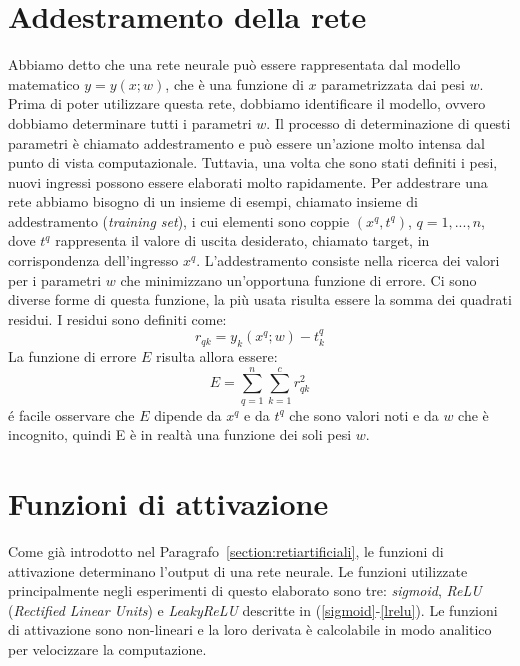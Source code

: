 \documentclass[11pt,a4paper,twoside,
openright]{book}
\begin{document}
\section{Addestramento della rete}
\label{addestramento}
Abbiamo detto che una rete neurale può essere rappresentata dal modello matematico $y = y(x; w)$, che è una funzione di $x$ parametrizzata dai pesi $w$. Prima di poter utilizzare questa rete, dobbiamo identificare il modello, ovvero dobbiamo determinare tutti i parametri $w$. Il processo di determinazione di questi parametri è chiamato addestramento e può essere un’azione molto intensa dal punto di vista computazionale. Tuttavia, una volta che sono stati definiti i pesi, nuovi ingressi possono essere elaborati molto rapidamente.
Per addestrare una rete abbiamo bisogno di un insieme di esempi, chiamato insieme di addestramento (\textit{training set}), i cui elementi sono coppie $(x^{q}, t^{q})$, $q = 1, ..., n$, dove $t^{q}$ rappresenta il valore di uscita desiderato, chiamato target, in corrispondenza dell'ingresso $x^{q}$. 
L’addestramento consiste nella ricerca dei valori per i parametri $w$ che minimizzano un’opportuna funzione di errore. Ci sono diverse forme di questa funzione, la più usata risulta essere la somma dei quadrati residui. I residui sono definiti come:
\begin{equation}
r_{qk} = y_{k}\left(x^{q}; w\right) - t^{q}_{k}
\label{res}
\end{equation}
La funzione di errore $E$ risulta allora essere:
\begin{equation}
E = \sum\limits_{q=1}^n \sum\limits_{k=1}^c r_{qk}^{2}
\label{quadres}
\end{equation}
é facile osservare che $E$ dipende da $x^{q}$ e da $t^{q}$ che sono valori noti e da $w$ che è incognito, quindi E è in realtà una funzione dei soli pesi $w$.

\section{Funzioni di attivazione}
Come già introdotto nel Paragrafo~\ref{section:retiartificiali}, le funzioni di attivazione determinano l'output di una rete neurale.
Le funzioni utilizzate principalmente negli esperimenti di questo elaborato sono tre: \textit{sigmoid}, \textit{ReLU} (\textit{Rectified Linear Units}) e \textit{LeakyReLU} descritte in (\ref{sigmoid}-\ref{lrelu}).
Le funzioni di attivazione sono non-lineari e la loro derivata è calcolabile in modo analitico per velocizzare la computazione.
\end{document}
